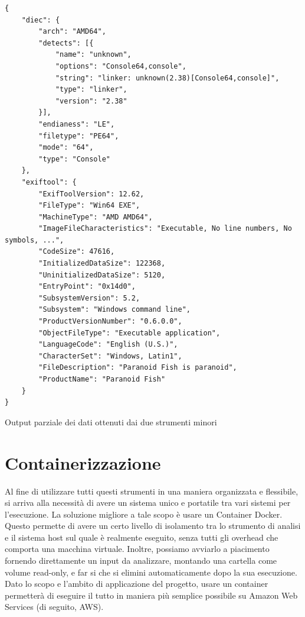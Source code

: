 \begin{code}
\begin{verbatim}
{
    "diec": {
        "arch": "AMD64",
        "detects": [{
            "name": "unknown",
            "options": "Console64,console",
            "string": "linker: unknown(2.38)[Console64,console]",
            "type": "linker",
            "version": "2.38"
        }],
        "endianess": "LE",
        "filetype": "PE64",
        "mode": "64",
        "type": "Console"
    },
    "exiftool": {
        "ExifToolVersion": 12.62,
        "FileType": "Win64 EXE",
        "MachineType": "AMD AMD64",
        "ImageFileCharacteristics": "Executable, No line numbers, No symbols, ...",
        "CodeSize": 47616,
        "InitializedDataSize": 122368,
        "UninitializedDataSize": 5120,
        "EntryPoint": "0x14d0",
        "SubsystemVersion": 5.2,
        "Subsystem": "Windows command line",
        "ProductVersionNumber": "0.6.0.0",
        "ObjectFileType": "Executable application",
        "LanguageCode": "English (U.S.)",
        "CharacterSet": "Windows, Latin1",
        "FileDescription": "Paranoid Fish is paranoid",
        "ProductName": "Paranoid Fish"
    }
}
\end{verbatim}
\caption{Output parziale dei dati ottenuti dai due strumenti minori}
\end{code}

\section{Containerizzazione}
Al fine di utilizzare tutti questi strumenti in una maniera organizzata e flessibile,
si arriva alla necessità di avere un sistema unico e portatile tra vari sistemi per l'esecuzione. La soluzione migliore a tale scopo è usare un Container Docker.
Questo permette di avere un certo livello di isolamento tra lo strumento di analisi e il sistema host sul quale è realmente eseguito, senza tutti gli overhead che comporta una macchina virtuale. Inoltre, possiamo avviarlo a piacimento fornendo direttamente un input da analizzare, montando una cartella come volume read-only, e far si che si elimini automaticamente dopo la sua esecuzione.
Dato lo scopo e l'ambito di applicazione del progetto, usare un container permetterà di eseguire il tutto in maniera più semplice possibile su Amazon Web Services (di seguito, AWS).

